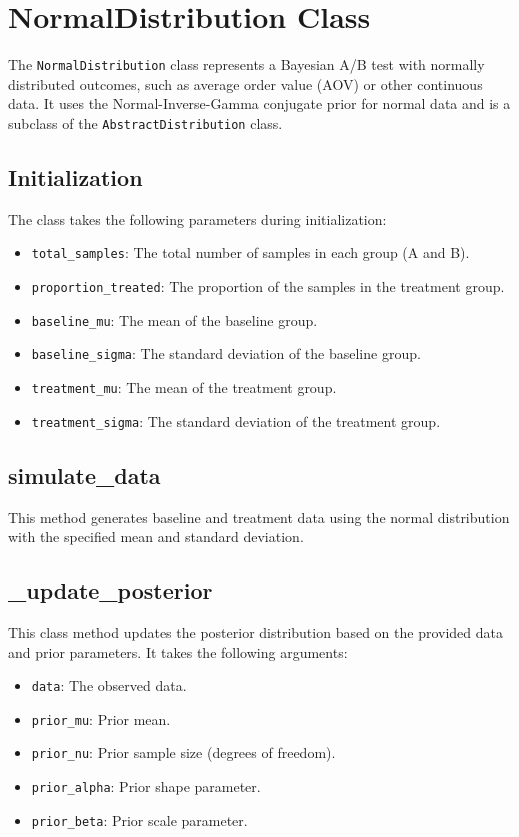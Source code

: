 \documentclass{article}
\begin{document}
\section{NormalDistribution Class}

The \texttt{NormalDistribution} class represents a Bayesian A/B test with normally distributed outcomes, such as average order value (AOV) or other continuous data. It uses the Normal-Inverse-Gamma conjugate prior for normal data and is a subclass of the \texttt{AbstractDistribution} class.

\subsection{Initialization}

The class takes the following parameters during initialization:

\begin{itemize}
    \item \texttt{total\_samples}: The total number of samples in each group (A and B).
    \item \texttt{proportion\_treated}: The proportion of the samples in the treatment group.
    \item \texttt{baseline\_mu}: The mean of the baseline group.
    \item \texttt{baseline\_sigma}: The standard deviation of the baseline group.
    \item \texttt{treatment\_mu}: The mean of the treatment group.
    \item \texttt{treatment\_sigma}: The standard deviation of the treatment group.
\end{itemize}

\subsection{simulate\_data}

This method generates baseline and treatment data using the normal distribution with the specified mean and standard deviation.

\subsection{\_update\_posterior}

This class method updates the posterior distribution based on the provided data and prior parameters. It takes the following arguments:

\begin{itemize}
    \item \texttt{data}: The observed data.
    \item \texttt{prior\_mu}: Prior mean.
    \item \texttt{prior\_nu}: Prior sample size (degrees of freedom).
    \item \texttt{prior\_alpha}: Prior shape parameter.
    \item \texttt{prior\_beta}: Prior scale parameter.
\end{itemize}
\end{document}
